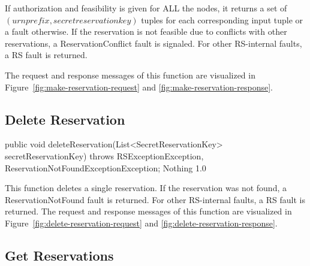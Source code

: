 \documentclass[a4paper,11pt]{article}
\begin{document}
If authorization and feasibility is given for ALL the nodes, it returns a set of $(urnprefix, secretreservationkey)$ tuples for each corresponding input tuple or a fault otherwise. If the reservation is not feasible due to conflicts with other reservations, a ReservationConflict fault is signaled. For other RS-internal faults, a RS fault is returned.

The request and response messages of this function are visualized in Figure~\ref{fig:make-reservation-request} and \ref{fig:make-reservation-response}.
	

			\sectionfin
			\subsection{Delete Reservation}

\begin{apidoc}
	{public void deleteReservation(List<SecretReservationKey> secretReservationKey) throws RSExceptionException, ReservationNotFoundExceptionException;} %
	{} %
	{
	} %
	{Nothing} %
	{} %
	{1.0} %
\end{apidoc}

This function deletes a single reservation. If the reservation was not found, a ReservationNotFound fault is returned.  For other RS-internal faults, a RS fault is returned. The request and response messages of this function are visualized in Figure~\ref{fig:delete-reservation-request} and \ref{fig:delete-reservation-response}.

		
			\sectionfin
			\subsection{Get Reservations}
\end{document}
